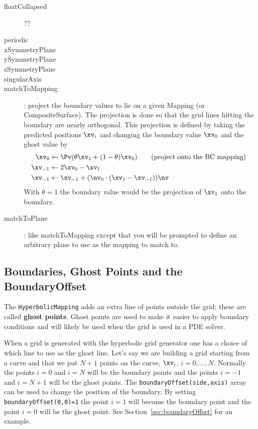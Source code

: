 \begin{description}
 \item[floatCollapsed] ??
 \item[periodic]
 \item[xSymmetryPlane]
 \item[ySymmetryPlane]
 \item[zSymmetryPlane]
 \item[singularAxis]
 \item[matchToMapping] : project the boundary values to lie on a given Mapping (or CompositeSurface).
       The projection is done so that the grid lines hitting the boundary are nearly orthogonal.
       This projection is defined by taking the predicted positions $\xv_i$ and changing the boundary
       value $\xv_0$ and the ghost value by
\begin{align*}
  \xv_0 &\leftarrow \Pv(  \theta \xv_1 + (1-\theta) \xv_0 ) \qquad \mbox{(project onto the BC mapping)} \\
  \xv_{-1} &\leftarrow 2 \xv_0 - \xv_1 \\
  \xv_{-1} &\leftarrow \xv_{-1} + (\nv_0\cdot(\xv_1-\xv_{-1}))\nv
\end{align*}
With $\theta=1$ the boundary value would be the projection of $\xv_1$ onto the boundary. 
 \item[matchToPlane] : like matchToMapping except that you will be prompted to define an arbitrary
     plane to use as the mapping to match to.
\end{description}

\subsection{Boundaries, Ghost Points and the BoundaryOffset} \label{sec:boundariesGhostPoints}

The {\tt HyperbolicMapping} adds an extra line of points outside the grid; these
are called {\bf ghost points}. Ghost points are used to make it easier to apply boundary conditions
and will likely be used when the grid is used in a PDE solver. 

When a grid is generated with the hyperbolic grid generator one has a choice of which line
to use as the ghost line. Let's say we are building a grid starting from a curve and that
we put $N+1$ points on the curve, $\xv_i$, $i=0,\ldots,N$. Normally the points $i=0$ and $i=N$
will be the boundary points and the points $i=-1$ and $i=N+1$ will be the ghost points. 
The {\tt boundaryOffset(side,axis)} array can be used to change the position of the boundary.
By setting {\tt boundaryOffset(0,0)=1} the point $i=1$ will become the boundary point
and the point $i=0$ will be the ghost point. See Section~\ref{sec:boundaryOffset} for an example.

